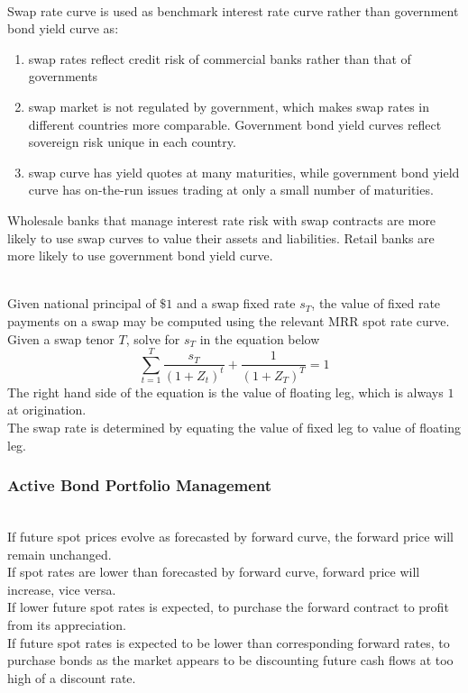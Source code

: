 \begin{remark} \\
Swap rate curve is used as benchmark interest rate curve rather than government bond yield curve as:
\begin{enumerate}[label=\roman*.]
\setlength{\itemsep}{0pt}
\item swap rates reflect credit risk of commercial banks rather than that of governments
\item swap market is not regulated by government, which makes swap rates in different countries more comparable. Government bond yield curves reflect sovereign risk unique in each country.
\item swap curve has yield quotes at many maturities, while government bond yield curve has on-the-run issues trading at only a small number of maturities.
\end{enumerate}
Wholesale banks that manage interest rate risk with swap contracts are more likely to use swap curves to value their assets and liabilities. Retail banks are more likely to use government bond yield curve.
\end{remark}

\begin{remark} \\
Given national principal of $\$1$ and a swap fixed rate $s_T$, the value of fixed rate payments on a swap may be computed using the relevant MRR spot rate curve.\\
Given a swap tenor $T$, solve for $s_T$ in the equation below
\begin{equation}
\sum\limits_{t=1}^T \frac{s_T}{(1+Z_t)^t} + \frac{1}{(1+Z_T)^T} = 1 \nonumber
\end{equation}
The right hand side of the equation is the value of floating leg, which is always $1$ at origination.\\
The swap rate is determined by equating the value of fixed leg to value of floating leg.
\end{remark}

\subsubsection{Active Bond Portfolio Management}

\begin{remark} \\
If future spot prices evolve as forecasted by forward curve, the forward price will remain unchanged.\\
If spot rates are lower than forecasted by forward curve, forward price will increase, vice versa.\\
If lower future spot rates is expected, to purchase the forward contract to profit from its appreciation.\\
If future spot rates is expected to be lower than corresponding forward rates, to purchase bonds as the market appears to be discounting future cash flows at too high of a discount rate.
\end{remark}


